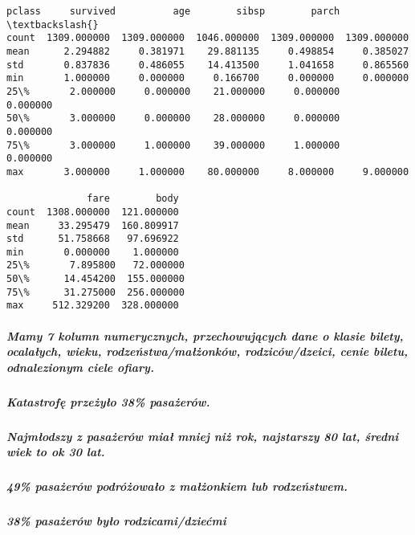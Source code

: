\documentclass[11pt]{article}
\makeatletter
\newcommand{\boxspacing}{\kern\kvtcb@left@rule\kern\kvtcb@boxsep}
\newcommand{\prompt}[4]{
        {\ttfamily\llap{{\color{#2}[#3]:\hspace{3pt}#4}}\vspace{-\baselineskip}}
    }
\makeatother
\begin{document}
            \begin{tcolorbox}[breakable, size=fbox, boxrule=.5pt, pad at break*=1mm, opacityfill=0]
\prompt{Out}{outcolor}{71}{\boxspacing}
\begin{Verbatim}[commandchars=\\\{\}]
            pclass     survived          age        sibsp        parch  \textbackslash{}
count  1309.000000  1309.000000  1046.000000  1309.000000  1309.000000
mean      2.294882     0.381971    29.881135     0.498854     0.385027
std       0.837836     0.486055    14.413500     1.041658     0.865560
min       1.000000     0.000000     0.166700     0.000000     0.000000
25\%       2.000000     0.000000    21.000000     0.000000     0.000000
50\%       3.000000     0.000000    28.000000     0.000000     0.000000
75\%       3.000000     1.000000    39.000000     1.000000     0.000000
max       3.000000     1.000000    80.000000     8.000000     9.000000

              fare        body
count  1308.000000  121.000000
mean     33.295479  160.809917
std      51.758668   97.696922
min       0.000000    1.000000
25\%       7.895800   72.000000
50\%      14.454200  155.000000
75\%      31.275000  256.000000
max     512.329200  328.000000
\end{Verbatim}
\end{tcolorbox}
        
    \subparagraph{Mamy 7 kolumn numerycznych, przechowujących dane o klasie
bilety, ocalałych, wieku, rodzeństwa/małżonków, rodziców/dzeici, cenie
biletu, odnalezionym ciele
ofiary.}\label{mamy-7-kolumn-numerycznych-przechowujux105cych-dane-o-klasie-bilety-ocalaux142ych-wieku-rodzeux144stwamaux142ux17conkuxf3w-rodzicuxf3wdzeici-cenie-biletu-odnalezionym-ciele-ofiary.}

\subparagraph{Katastrofę przeżyło 38\%
pasażerów.}\label{katastrofux119-przeux17cyux142o-38-pasaux17ceruxf3w.}

\subparagraph{Najmłodszy z pasażerów miał mniej niż rok, najstarszy 80
lat, średni wiek to ok 30
lat.}\label{najmux142odszy-z-pasaux17ceruxf3w-miaux142-mniej-niux17c-rok-najstarszy-80-lat-ux15bredni-wiek-to-ok-30-lat.}

\subparagraph{49\% pasażerów podróżowało z małżonkiem lub
rodzeństwem.}\label{pasaux17ceruxf3w-podruxf3ux17cowaux142o-z-maux142ux17conkiem-lub-rodzeux144stwem.}

\subparagraph{38\% pasażerów było
rodzicami/dziećmi}\label{pasaux17ceruxf3w-byux142o-rodzicamidzieux107mi}
\end{document}
